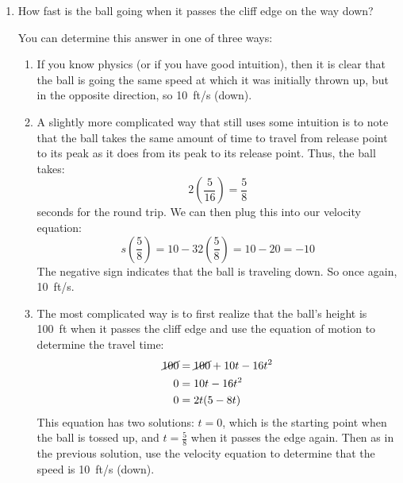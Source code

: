 \documentclass[letterpaper,12pt,fleqn]{article}
\begin{document}
\begin{enumerate}
\item How fast is the ball going when it passes the cliff edge on the way down?

  You can determine this answer in one of three ways:
  \begin{enumerate}
  \item If you know physics (or if you have good intuition), then it is clear that the ball is going the same speed at
    which it was initially thrown up, but in the opposite direction, so \SI{10}{ft/s} (down).

  \item A slightly more complicated way that still uses some intuition is to note that the ball takes the same amount of time
    to travel from release point to its peak as it does from its peak to its release point.  Thus, the ball takes:
    \[2\left(\frac{5}{16}\right)=\frac{5}{8}\]
    seconds for the round trip.  We can then plug this into our velocity equation:
    \[s\left(\frac{5}{8}\right)=10-32\left(\frac{5}{8}\right)=10-20=-10\]
    The negative sign indicates that the ball is traveling down.  So once again, \SI{10}{ft/s}.

  \item The most complicated way is to first realize that the ball's height is \SI{100}{ft} when it passes the cliff edge and
    use the equation of motion to determine the travel time:
    \begin{align*}
      \cancel{100} &= \cancel{100}+10t-16t^2 \\
      0 &= 10t-16t^2 \\
      0 &= 2t(5-8t)
    \end{align*}
    This equation has two solutions: \(t=0\), which is the starting point when the ball is tossed up, and \(t=\frac{5}{8}\)
    when it passes the edge again.  Then as in the previous solution, use the velocity equation to determine that the speed
    is \SI{10}{ft/s} (down).
  \end{enumerate}
\end{enumerate}
\end{document}
